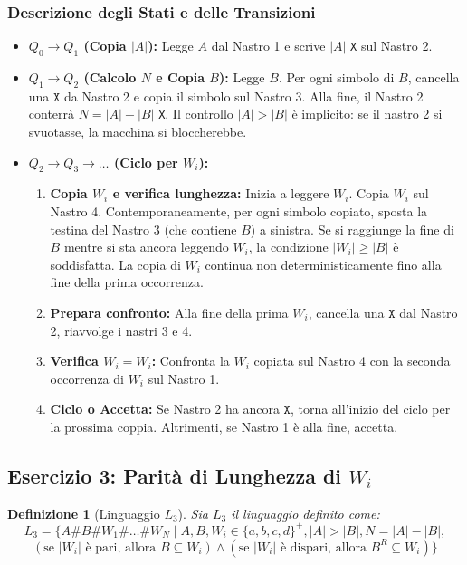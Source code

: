 \documentclass[a4paper]{article}
\newtheorem{definition}{Definizione}
\newcommand{\Sh}{\texttt{\#}} %
\newcommand{\X}{\texttt{X}} %
\begin{document}
\subsubsection{Descrizione degli Stati e delle Transizioni}
\begin{itemize}
    \item \textbf{$Q_0 \to Q_1$ (Copia $|A|$):} Legge $A$ dal Nastro 1 e scrive $|A|$ \texttt{X} sul Nastro 2.
    \item \textbf{$Q_1 \to Q_2$ (Calcolo $N$ e Copia $B$):} Legge $B$. Per ogni simbolo di $B$, cancella una $\X$ da Nastro 2 e copia il simbolo sul Nastro 3. Alla fine, il Nastro 2 conterrà $N=|A|-|B|$ \texttt{X}. Il controllo $|A|>|B|$ è implicito: se il nastro 2 si svuotasse, la macchina si bloccherebbe.
    \item \textbf{$Q_2 \to Q_3 \to \dots$ (Ciclo per $W_i$):}
    \begin{enumerate}
        \item \textbf{Copia $W_i$ e verifica lunghezza:} Inizia a leggere $W_i$. Copia $W_i$ sul Nastro 4. Contemporaneamente, per ogni simbolo copiato, sposta la testina del Nastro 3 (che contiene $B$) a sinistra. Se si raggiunge la fine di $B$ mentre si sta ancora leggendo $W_i$, la condizione $|W_i| \ge |B|$ è soddisfatta. La copia di $W_i$ continua non deterministicamente fino alla fine della prima occorrenza.
        \item \textbf{Prepara confronto:} Alla fine della prima $W_i$, cancella una $\X$ dal Nastro 2, riavvolge i nastri 3 e 4.
        \item \textbf{Verifica $W_i=W_i$:} Confronta la $W_i$ copiata sul Nastro 4 con la seconda occorrenza di $W_i$ sul Nastro 1.
        \item \textbf{Ciclo o Accetta:} Se Nastro 2 ha ancora $\X$, torna all'inizio del ciclo per la prossima coppia. Altrimenti, se Nastro 1 è alla fine, accetta.
    \end{enumerate}
\end{itemize}


\subsection{Esercizio 3: Parità di Lunghezza di $W_i$}

\begin{definition}[Linguaggio $L_3$]
Sia $L_3$ il linguaggio definito come:
\[
L_3 = \{A\Sh B\Sh W_1 \Sh \dots \Sh W_N \mid A, B, W_i \in \{a,b,c,d\}^+, |A| > |B|, N = |A| - |B|, 
\]
$\qquad (\text{se } |W_i| \text{ è pari, allora } B \subseteq W_i) \land (\text{se } |W_i| \text{ è dispari, allora } B^R \subseteq W_i) \}$
\end{definition}
\end{document}
